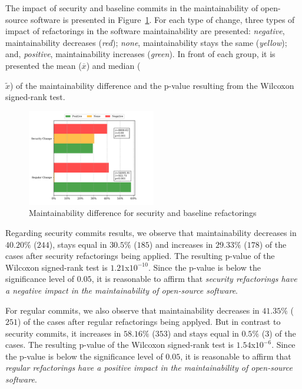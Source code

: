 \documentclass[10pt,conference]{IEEEtran}
\begin{document}
The impact of security and baseline commits in the maintainability of
open-source software is presented in Figure~\ref{fig:secvsreg}. For each type of
change, three types of impact of refactorings in the software maintainability
are presented: \emph{negative}, maintainability decreases (\emph{red});
\emph{none}, maintainability stays the same (\emph{yellow}); and,
\emph{positive}, maintainability increases (\emph{green}). In front of each
group, it is presented the mean ($\overline{x}$) and median ({$\widetilde{x}$)
of the maintainability difference and the p-value resulting from the Wilcoxon
signed-rank test.

\begin{figure}[h]
 	\centering 	\includegraphics[width=0.5\textwidth]{figures/maintainability.pdf}
 	\caption{Maintainability difference for security and baseline refactorings}
	\label{fig:secvsreg}
\end{figure}

Regarding security commits results, we observe that maintainability decreases in
$40.20\%$ ($244$), stays equal in $30.5\%$ ($185$) and increases in $29.33\%$
($178$) of the cases after security refactorings being applied. The resulting
p-value of the Wilcoxon signed-rank test is $1.21$x$10^{-10}$. Since the p-value
is below the significance level of $0.05$, it is reasonable to affirm that
\emph{security refactorings have a negative impact in the maintainability of
open-source software}.

For regular commits, we also observe that maintainability decreases in $41.35\%$
($251$) of the cases after regular refactorings being applyed. But in contrast
to security commits, it increases in $58.16\%$ ($353$) and stays equal in
$0.5\%$ ($3$) of the cases. The resulting p-value of the Wilcoxon signed-rank
test is $1.54$x$10^{-6}$. Since the p-value is below the significance level of
$0.05$, it is reasonable to affirm that \emph{regular refactorings have a
positive impact in the maintainability of open-source software}.

}
\end{document}
